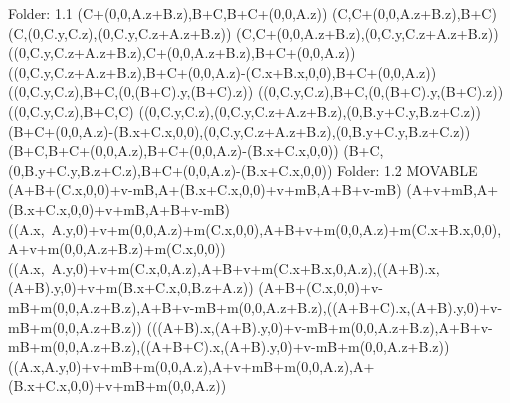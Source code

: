 Folder: 1.1
\left(C+\left(0,0,A.z+B.z\right),B+C,B+C+\left(0,0,A.z\right)\right)
\left(C,C+\left(0,0,A.z+B.z\right),B+C\right)
\left(C,\left(0,C.y,C.z\right),\left(0,C.y,C.z+A.z+B.z\right)\right)
\left(C,C+\left(0,0,A.z+B.z\right),\left(0,C.y,C.z+A.z+B.z\right)\right)
\left(\left(0,C.y,C.z+A.z+B.z\right),C+\left(0,0,A.z+B.z\right),B+C+\left(0,0,A.z\right)\right)
\left(\left(0,C.y,C.z+A.z+B.z\right),B+C+\left(0,0,A.z\right)-\left(C.x+B.x,0,0\right),B+C+\left(0,0,A.z\right)\right)
\left(\left(0,C.y,C.z\right),B+C,\left(0,\left(B+C\right).y,\left(B+C\right).z\right)\right)
\left(\left(0,C.y,C.z\right),B+C,\left(0,\left(B+C\right).y,\left(B+C\right).z\right)\right)
\left(\left(0,C.y,C.z\right),B+C,C\right)
\left(\left(0,C.y,C.z\right),\left(0,C.y,C.z+A.z+B.z\right),\left(0,B.y+C.y,B.z+C.z\right)\right)
\left(B+C+\left(0,0,A.z\right)-\left(B.x+C.x,0,0\right),\left(0,C.y,C.z+A.z+B.z\right),\left(0,B.y+C.y,B.z+C.z\right)\right)
\left(B+C,B+C+\left(0,0,A.z\right),B+C+\left(0,0,A.z\right)-\left(B.x+C.x,0,0\right)\right)
\left(B+C,\left(0,B.y+C.y,B.z+C.z\right),B+C+\left(0,0,A.z\right)-\left(B.x+C.x,0,0\right)\right)
Folder: 1.2 MOVABLE
\left(A+B+\left(C.x,0,0\right)+v-mB,A+\left(B.x+C.x,0,0\right)+v+mB,A+B+v-mB\right)
\left(A+v+mB,A+\left(B.x+C.x,0,0\right)+v+mB,A+B+v-mB\right)
\left(\left(A.x,\ A.y,0\right)+v+m\left(0,0,A.z\right)+m\left(C.x,0,0\right),A+B+v+m\left(0,0,A.z\right)+m\left(C.x+B.x,0,0\right),\ A+v+m\left(0,0,A.z+B.z\right)+m\left(C.x,0,0\right)\right)
\left(\left(A.x,\ A.y,0\right)+v+m\left(C.x,0,A.z\right),A+B+v+m\left(C.x+B.x,0,A.z\right),\left(\left(A+B\right).x,\left(A+B\right).y,0\right)+v+m\left(B.x+C.x,0,B.z+A.z\right)\right)
\left(A+B+\left(C.x,0,0\right)+v-mB+m\left(0,0,A.z+B.z\right),A+B+v-mB+m\left(0,0,A.z+B.z\right),\left(\left(A+B+C\right).x,\left(A+B\right).y,0\right)+v-mB+m\left(0,0,A.z+B.z\right)\right)
\left(\left(\left(A+B\right).x,\left(A+B\right).y,0\right)+v-mB+m\left(0,0,A.z+B.z\right),A+B+v-mB+m\left(0,0,A.z+B.z\right),\left(\left(A+B+C\right).x,\left(A+B\right).y,0\right)+v-mB+m\left(0,0,A.z+B.z\right)\right)
\left(\left(A.x,A.y,0\right)+v+mB+m\left(0,0,A.z\right),A+v+mB+m\left(0,0,A.z\right),A+\left(B.x+C.x,0,0\right)+v+mB+m\left(0,0,A.z\right)\right)
